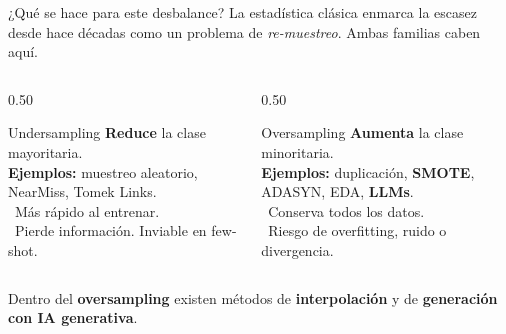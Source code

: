 \begin{frame}{¿Qué se hace para este desbalance?}
\small
La estadística clásica enmarca la escasez desde hace décadas como un problema de \emph{re-muestreo}. Ambas familias caben aquí.

\vspace{0.5em}
\begin{columns}[T]

\begin{column}{0.50\textwidth}
\begin{block}{Undersampling}
\scriptsize
\textbf{Reduce} la clase mayoritaria.\\[2pt]
\textbf{Ejemplos:} muestreo aleatorio, NearMiss, Tomek Links.\\[2pt]
\good\ Más rápido al entrenar.\\
\bad\ Pierde información. \alert{Inviable en few-shot}.
\end{block}
\end{column}

\begin{column}{0.50\textwidth}
\begin{block}{Oversampling}
\scriptsize
\textbf{Aumenta} la clase minoritaria.\\[2pt]
\textbf{Ejemplos:} duplicación, \textbf{SMOTE}, ADASYN, EDA, \textbf{LLMs}.\\[2pt]
\good\ Conserva todos los datos.\\
\bad\ Riesgo de overfitting, ruido o divergencia.
\end{block}
\end{column}

\end{columns}

\vspace{0.7em}
\centering
{\small Dentro del \textbf{oversampling} existen métodos de \textbf{interpolación} y de \textbf{generación con IA generativa}.}

\end{frame}
